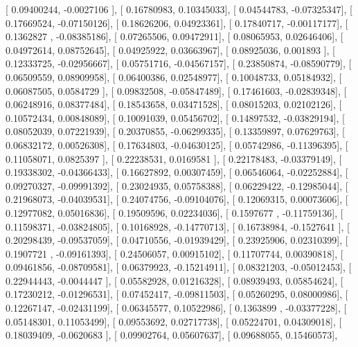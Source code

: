 \documentclass{article}
\begin{document}
       [ 0.09400244, -0.0027106 ],
       [ 0.16780983,  0.10345033],
       [ 0.04544783, -0.07325347],
       [ 0.17669524, -0.07150126],
       [ 0.18626206,  0.04923361],
       [ 0.17840717, -0.00117177],
       [ 0.1362827 , -0.08385186],
       [ 0.07265506,  0.09472911],
       [ 0.08065953,  0.02646406],
       [ 0.04972614,  0.08752645],
       [ 0.04925922,  0.03663967],
       [ 0.08925036,  0.001893  ],
       [ 0.12333725, -0.02956667],
       [ 0.05751716, -0.04567157],
       [ 0.23850874, -0.08590779],
       [ 0.06509559,  0.08909958],
       [ 0.06400386,  0.02548977],
       [ 0.10048733,  0.05184932],
       [ 0.06087505,  0.0584729 ],
       [ 0.09832508, -0.05847489],
       [ 0.17461603, -0.02839348],
       [ 0.06248916,  0.08377484],
       [ 0.18543658,  0.03471528],
       [ 0.08015203,  0.02102126],
       [ 0.10572434,  0.00848089],
       [ 0.10091039,  0.05456702],
       [ 0.14897532, -0.03829194],
       [ 0.08052039,  0.07221939],
       [ 0.20370855, -0.06299335],
       [ 0.13359897,  0.07629763],
       [ 0.06832172,  0.00526308],
       [ 0.17634803, -0.04630125],
       [ 0.05742986, -0.11396395],
       [ 0.11058071,  0.0825397 ],
       [ 0.22238531,  0.0169581 ],
       [ 0.22178483, -0.03379149],
       [ 0.19338302, -0.04366433],
       [ 0.16627892,  0.00307459],
       [ 0.06546064, -0.02252884],
       [ 0.09270327, -0.09991392],
       [ 0.23024935,  0.05758388],
       [ 0.06229422, -0.12985044],
       [ 0.21968073, -0.04039531],
       [ 0.24074756, -0.09104076],
       [ 0.12069315,  0.00073606],
       [ 0.12977082,  0.05016836],
       [ 0.19509596,  0.02234036],
       [ 0.1597677 , -0.11759136],
       [ 0.11598371, -0.03824805],
       [ 0.10168928, -0.14770713],
       [ 0.16738984, -0.1527641 ],
       [ 0.20298439, -0.09537059],
       [ 0.04710556, -0.01939429],
       [ 0.23925906,  0.02310399],
       [ 0.1907721 , -0.09161393],
       [ 0.24506057,  0.00915102],
       [ 0.11707744,  0.00390818],
       [ 0.09461856, -0.08709581],
       [ 0.06379923, -0.15214911],
       [ 0.08321203, -0.05012453],
       [ 0.22944443, -0.0044447 ],
       [ 0.05582928,  0.01216328],
       [ 0.08939493,  0.05854624],
       [ 0.17230212, -0.01296531],
       [ 0.07452417, -0.09811503],
       [ 0.05260295,  0.08000986],
       [ 0.12267147, -0.02431199],
       [ 0.06345577,  0.10522986],
       [ 0.1363899 , -0.03377228],
       [ 0.05148301,  0.11053499],
       [ 0.09553692,  0.02717738],
       [ 0.05224701,  0.04309018],
       [ 0.18039409, -0.0620683 ],
       [ 0.09902764,  0.05607637],
       [ 0.09688055,  0.15460573],
\end{document}
